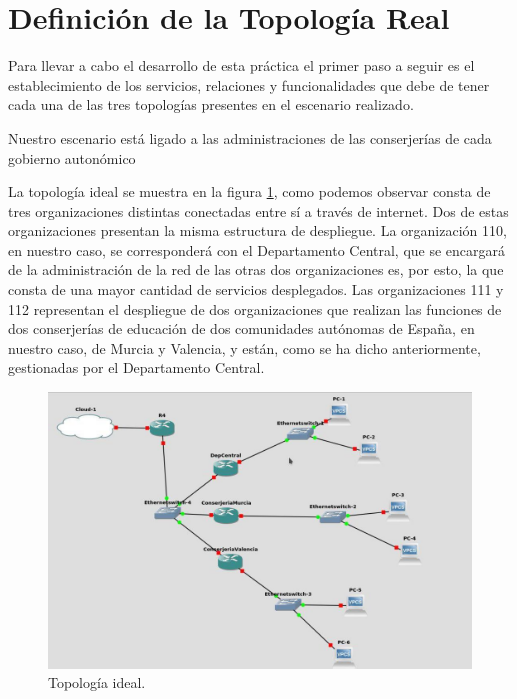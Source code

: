 \documentclass[a4paper]{article}
\begin{document}

\thispagestyle{empty}
\tableofcontents
\newpage


\section{Definición de la Topología Real}

Para llevar a cabo el desarrollo de esta práctica el primer paso a seguir es el establecimiento de los servicios, relaciones y funcionalidades que debe de tener cada una de las tres topologías presentes en el escenario realizado. 

 Nuestro escenario está ligado a las administraciones de las conserjerías de cada gobierno autonómico


 La topología ideal se muestra en la figura \ref{fig:topoideal}, como podemos observar consta de tres organizaciones distintas conectadas entre sí a través de internet. Dos de estas organizaciones presentan la misma estructura de despliegue. La organización 110, en nuestro caso, se corresponderá con el Departamento Central, que se encargará de la administración de la red de las otras dos organizaciones es, por esto, la que consta de una
mayor cantidad de servicios desplegados. Las organizaciones 111 y 112 representan el despliegue de dos organizaciones que realizan las funciones de dos conserjerías de educación de dos comunidades autónomas de España, en nuestro caso, de Murcia y Valencia, y están, como se ha dicho anteriormente, gestionadas por el Departamento Central.
\begin{figure}[htb]
    \begin{center}
        \includegraphics[width=1\textwidth]{topoideal.jpg}
         \caption{Topología ideal.}
         \label{fig:topoideal}
    \end{center}
\end{figure}
\end{document}
